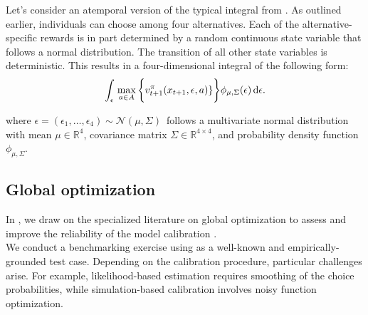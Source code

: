 \noindent Let's consider an atemporal version of the typical integral from \citet{Keane.1994}. As outlined earlier, individuals can choose among four alternatives. Each of the alternative-specific rewards is in part determined by a random continuous state variable that follows a normal distribution. The transition of all other state variables is deterministic. This results in a four-dimensional integral of the following form:
%
\begin{align*}
   \int_{\epsilon}\, \max_{a\in A} \bigg\{v_{t + 1}^\pi(x_{t + 1}, \epsilon, a)\}\bigg\} \phi_{\mu, \Sigma}(\epsilon) \mathop{}\!\mathrm{d}\epsilon.
\end{align*}

\noindent where $\epsilon = (\epsilon_1, \dots, \epsilon_4) \sim \mathcal{N}(\mu, \Sigma)\,$ follows a multivariate normal distribution with mean $\mu \in \mathbb{R}^{4}$, covariance matrix $ \Sigma \in \mathbb{R}^{4 \times 4}$, and probability density function $\phi_{\mu, \Sigma}$.
\subsection{Global optimization}
In \citet{Gabler.2020}, we draw on the specialized literature on global optimization to assess and improve the reliability of the model calibration \citep{Nocedal.2006,Locatelli.2013}.\\

\noindent We conduct a benchmarking exercise using \citet{Keane.1994,Keane.1997} as a well-known and empirically-grounded test case. Depending on the calibration procedure, particular challenges arise. For example, likelihood-based estimation requires smoothing of the choice probabilities, while simulation-based calibration involves noisy function optimization.
